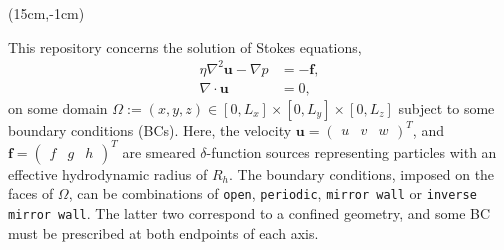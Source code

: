 
\usepackage{verbatimbox}
\usepackage{wrapfig} 
\usepackage{rotating}
\usepackage{mathrsfs}
\usepackage{cancel}
\usepackage{pdfpages}
\newcommand{\bs}{\boldsymbol}
\newcommand{\kpar}{k_{\shortparallel}}
\newcommand{\chebint}{\pmb{\mathscr{I}}}
\newcommand{\chebdiff}{\pmb{\mathscr{D}}}
\newcommand{\overbar}[1]{\mkern 1.5mu\overline{\mkern-1.5mu#1\mkern-1.5mu}\mkern 1.5mu}


\setcounter{secnumdepth}{5}
\setcounter{tocdepth}{4}
\begin{textblock*}{8cm}(15cm,-1cm)
\end{textblock*}

This repository concerns the solution of Stokes equations,
\begin{align}
\displaystyle \eta \nabla^2 \bs u - \nabla p &= -\bs f, \label{momentum}\\
\nabla \cdot \bs u &= 0, \label{continuity}
\end{align}
on some domain $\Omega := (x,y,z) \in[0,L_x] \times [0,L_y] \times [0,L_z]$ subject to some boundary conditions (BCs). Here, the velocity $\bs u = \begin{pmatrix}u & v & w \end{pmatrix}^T$, and $\bs f = \begin{pmatrix}f & g & h \end{pmatrix}^T$ are smeared $\delta$-function sources representing particles with an effective hydrodynamic radius of $R_h$. The boundary conditions, imposed on the faces of $\Omega$, can be combinations of \texttt{open}, \texttt{periodic}, \texttt{mirror wall} or \texttt{inverse mirror wall}. The latter two correspond to a confined geometry, and some BC must be prescribed at both endpoints of each axis.

